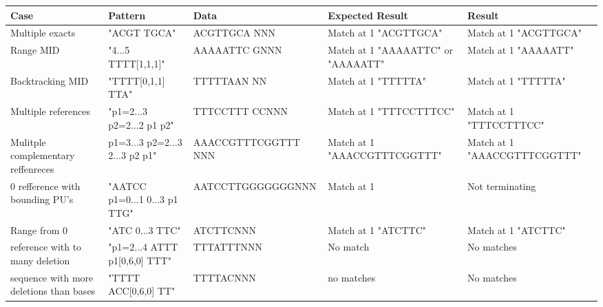 \documentclass[12pt]{article}
\newcommand{\textapprox}{\raisebox{0.5ex}{\texttildelow}}
\newcommand{\pus}{PU's }
\begin{document}
\begin{table}[H]
\begin{tabular}{p{4cm}|p{3cm}|p{2.5cm}|p{2.5cm}|p{2.5cm}}
Case 			& Pattern & Data & Expected Result & Result \\ \hline
\rowcolor{lightgreen}
Multiple exacts 	& "ACGT TGCA" & ACGTTGCA NNN & Match at 1 "ACGTTGCA" & Match at 1 "ACGTTGCA"\\ \hline
\rowcolor{lightgreen}
Range MID		& "4...5 TTTT[1,1,1]" & AAAAATTC GNNN & Match at 1 "AAAAATTC" or "AAAAATT" & Match at 1 "AAAAATT" \\ \hline
\rowcolor{lightgreen}
Backtracking MID & "TTTT[0,1,1] TTA" & TTTTTAAN NN & Match at 1 "TTTTTA" & Match at 1 "TTTTTA"\\ \hline
\rowcolor{lightgreen}
Multiple references & "p1=2...3 p2=2...2 p1 p2" & TTTCCTTT CCNNN & Match at 1 "TTTCCTTTCC" & Match at 1 "TTTCCTTTCC" \\ \hline
\rowcolor{lightgreen}
Mulitple complementary reffenreces & p1=3...3 p2=2...3 2...3 \textapprox p2 \textapprox p1" & 
AAACCGTTTCGGTTT NNN & Match at 1 "AAACCGTTTCGGTTT" & Match at 1 "AAACCGTTTCGGTTT" \\ \hline
\rowcolor{lightred}
0 refference with bounding \pus & "AATCC p1=0...1 0...3 p1 TTG" & AATCCTTGGGGGGGNNN & Match at 1 & Not terminating\\ \hline
\rowcolor{lightgreen}
Range from 0 & "ATC 0...3 TTC" & ATCTTCNNN & Match at 1 "ATCTTC" & Match at 1 "ATCTTC" \\ \hline
\rowcolor{lightgreen}
reference with to many deletion & "p1=2...4 ATTT p1[0,6,0] TTT" & TTTATTTNNN & No match & No matches \\ \hline
\rowcolor{lightgreen}
sequence with more deletions than bases & "TTTT ACC[0,6,0] TT" & TTTTACNNN & no matches & No matches
\end{tabular}
\end{table} 
\end{document}
